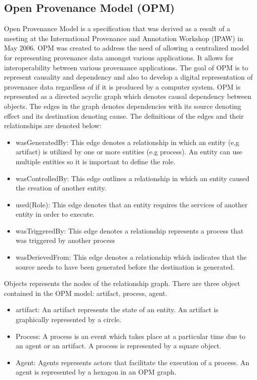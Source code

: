 \subsection{Open Provenance Model (OPM)}

Open Provenance Model \cite{moreau_open_2011} is a specification that was derived as a result of a meeting at the International Provenance and Annotation Workshop (IPAW) in May 2006. OPM was created to address the need of allowing a centralized model for representing provenance data amongst various applications. It allows for interoperability between various provenance applications. The goal of OPM is to represent causality and dependency and also to develop a digital representation of provenance data regardless of if it is produced by a computer system. OPM is represented as a directed acyclic graph which denotes causal dependency between objects. The edges in the graph denotes dependencies with its source denoting effect and its destination denoting cause. The definitions of the edges and their relationships are denoted below: 

\begin{itemize}
\item wasGeneratedBy: This edge denotes a  relationship in which an entity (e,g artifact) is utilized by one or  more entities (e.g process). An entity can use multiple entities so it is important to define the role.  
\item wasControlledBy: This edge outlines a relationship in which an entity caused the creation of another entity.
\item used(Role): This edge denotes that an entity requires the services of another entity in order to execute.
\item wasTriggeredBy: This edge denotes a relationship represents a process that was triggered by another process
\item wasDerievedFrom: This edge denotes a relationship which indicates that the source needs to have been generated before the destination is generated.
\end{itemize}

 Objects represents the nodes of the relationship graph. There are three object contained in the OPM model: artifact, process, agent. 

\begin{itemize}
\item
artifact: An artifact represents the state of an entity. An artifact is graphically represented by a circle.

\item
Process: A process is an event which takes place at a particular time due to an agent or an artifact. A process is represented by a square object.

\item 
Agent: Agents represents actors that facilitate the execution of a process. An agent is represented by a hexagon in an OPM graph.
\end{itemize}

